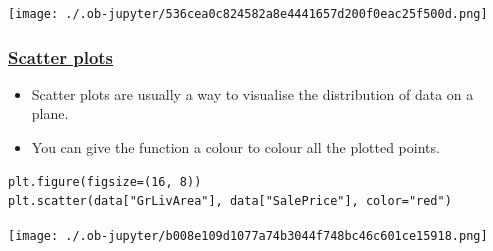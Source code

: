 \documentclass[11pt]{article}
\begin{document}
\begin{center}
\texttt{[image: ./.ob-jupyter/536cea0c824582a8e4441657d200f0eac25f500d.png]}
\label{org9127eb2}
\end{center}

 \newpage
\subsubsection{\href{https://matplotlib.org/stable/api/\_as\_gen/matplotlib.pyplot.scatter.html}{Scatter plots}}
\label{sec:org53c8610}
\begin{itemize}
\item Scatter plots are usually a way to visualise the distribution of data on a plane.
\item You can give the function a colour to colour all the plotted points.
\end{itemize}
\begin{verbatim}
plt.figure(figsize=(16, 8))
plt.scatter(data["GrLivArea"], data["SalePrice"], color="red")
\end{verbatim}

\begin{center}
\texttt{[image: ./.ob-jupyter/b008e109d1077a74b3044f748bc46c601ce15918.png]}
\label{org407d636}
\end{center}
\end{document}
